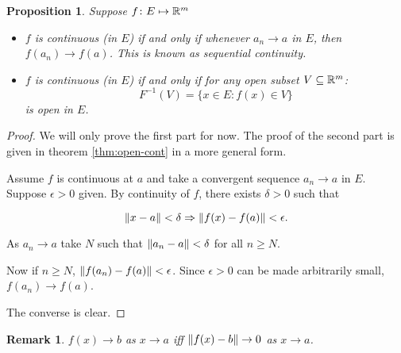 \documentclass{notes}
\theoremstyle{plain}
\newtheorem{proposition}{Proposition}[chapter]
\newtheorem*{remark}{Remark}
\begin{document}
\begin{proposition}\label{prop:seq-cont}
Suppose $ f\colon E \mapsto \mathbb{R}^{m} $

\begin{itemize}
\item $ f $ is continuous (in $ E $) if and only if whenever $ 
a_{n} \to a $ in $ E $, then $ f(a_{n}) \to f(a) $. 
This is known as \emph{sequential continuity}.

\item $ f $ is continuous (in $ E $) if and only if for any open 
subset $ V \subseteq \mathbb{R}^{m} $:
\[ F^{-1}(V) = \{ x \in E : f(x) \in 
V \} \] 
is open in $ E $.
\end{itemize}
\end{proposition}

\begin{proof}
We will only prove the first part for now.  The proof of the second
part is given in theorem \ref{thm:open-cont} in a more general form.

Assume $ f $ is continuous at $a$ and take a convergent sequence $
a_{n}\to a $ in $ E $.
Suppose $ \epsilon > 0  $ given.  By continuity of $ f $, there
exists  $ \delta>0 $ such that

\[
\left\|x-a\right\|< \delta \Rightarrow \left\|f(x)-f(a)\right\| < \epsilon.
\]

As $ a_{n} \to a $ take $ N $ such that $ 
\left\|a_{n}-a\right\| < \delta  $ for all $ n \geq N $.

Now if $ n \geq N $, $\left\|f(a_{n}) - f(a) \right\| < \epsilon$.
Since $ \epsilon>0 $ can be made arbitrarily small, $ f(a_{n}) \to 
f(a) $.

The converse is clear.
\end{proof}

\begin{remark} $ f(x) \to b $ as $ x \to a $ iff $ 
\left\|f(x)-b\right\| \to 0 $ as $ x \to a $.
\end{remark}
\end{document}
